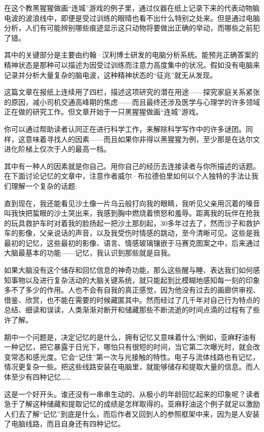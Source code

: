 在这个教黑猩猩做画“连城”游戏的例子里，通过仪器在纸上记录下来的代表动物脑电波的波浪线中，即便是受过训练的眼晴也看不出什么特别之处来。但是通过电脑分析，人们有可能辨别哪些痕迹显示这只动物将要做出正确的举动，而哪些之前犯了错。

其中的关键部分是主要由约翰·汉利博士研发的电脑分析系统。能预兆正确答案的精神状态是那种可以描述为因受过训练而注意力高度集中的状况。假如没有电脑来记录并分析大量复杂的脑电波，这种精神状态的“征兆”就无从发现。

这篇文章在报纸上连续用了四栏，描述这项研究的潜在用途——探究家庭关系紧张的原因，减小司机交通高峰期的焦虑——而且最终还涉及医学与心理学的许多领域正在做的研究工作。但文章开始于一只黑猩猩做画“连城”游戏。

你可以通过帮助读者认同正在进行科学工作，来解除科学写作中的许多谜团。同样，这意味着寻找人的因素——而且如果你非得以黑猩猩为例，至少那是在达尔文进化阶梯上仅次于人的最高一档。

其中有一种人的因素就是你自己。用你自己的经历去连接读者与你所描述的话题。在下面讨论记忆的文章中，注意作者威尔·布拉德伯里如何以个人独特的手法让我们理解一个复杂的话题:

直到现在，我还能看见沙土像一片乌云般打向我的眼睛，我听见父亲用沉着的嗓音叫我快把蜇眼的沙土哭出来，我感到胸中燃烧着愤怒和羞辱。距离我的玩伴在抢我的玩具救护车时对着我的脸扬起一把沙土那刻起，30多年过去了，然而沙子和救护车的影像，父亲说话的声音，以及我受伤时情感的跳动，至今清晰可见。这些是我最初的记忆，这些最初的影像、语言、情感玻璃镶嵌于马赛克图案之中，后来通过大脑最基本的功能——记忆，我认识到那些就是自我。

如果大脑没有这个储存和回忆信息的神奇功能，那么这些醒与睡、表达我们如何感知事物以及进行复杂活动的大脑关键系统，就只能起到比模糊地感知每一刻的印象多不了多少的作用。人也不会有自我的真正感觉，因为他没有过去的画廊供审视、借鉴、欣赏，也不能在需要的时候藏匿其中。然而经过了几千年对自己行为特点的总结、细读和误读，人类渐渐对断开和储藏那些不断流逝的时间点滴的过程有了些许了解。

期中一个问题是，决定记忆的是什么，拥有记忆又意味着什么?例如，亚麻籽油有一种记忆，把它暴露于日光下，哪怕只有很短的时间，当它第二次曝光时，就会改变常态和感光度。它会“记住”第一次与光接触的特性。电子与流体线路也有记忆，情况更复杂一些。把这些线路安装在电脑里，就能够储存和提取大量的信息。而人体至少有四种记忆……

这是一个好开头。谁还没有一串串生动的、从极小的年龄回忆起来的印象呢？读者急于了解这种储藏和提取记忆的成绩是怎样取得的。亚麻籽油这个例子就足以激励人们去了解“记忆”到底是什么，而后作者又回到人的参照框架中来，因为是人安装了电脑线路，而且自身还有四种记忆。


